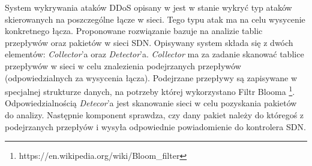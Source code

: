 System wykrywania ataków DDoS opisany w \cite{bloomarticle} jest w stanie wykryć
typ ataków skierowanych na poszczególne łącze w sieci. Tego typu atak ma na celu
wysycenie konkretnego łącza. Proponowane rozwiązanie bazuje na analizie tablic
przepływów oraz pakietów w sieci SDN. Opisywany system składa się z dwóch
elementów: \textit{Collector}'a oraz \textit{Detector}'a. \textit{Collector} ma
za zadanie skanować tablice przepływów w sieci w celu znalezienia podejrzanych
przepływów (odpowiedzialnych za wysycenia łącza). Podejrzane przepływy są
zapisywane w specjalnej strukturze danych, na potrzeby której wykorzystano Filtr
Blooma \footnote{https://en.wikipedia.org/wiki/Bloom\_filter}.
Odpowiedzialnością \textit{Detecor}'a jest skanowanie sieci w celu pozyskania
pakietów do analizy. Następnie komponent sprawdza, czy dany pakiet należy do
któregoś z podejrzanych przepłyów i wysyła odpowiednie powiadomienie do
kontrolera SDN.